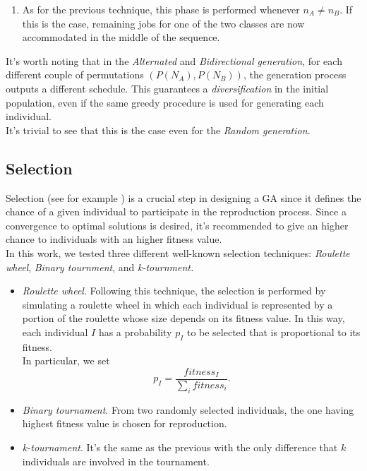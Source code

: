 \documentclass[opre,nonblindrev]{informs3} %
\begin{document}
\begin{itemize}
\begin{enumerate}
		\item As for the previous technique, this phase is performed whenever $n_A \ne n_B$. If this is the case, remaining jobs for one of the two classes are now accommodated in the middle of the sequence. 
	\end{enumerate}
	It's worth noting that in the \textit{Alternated} and \textit{Bidirectional generation}, for each different couple of permutations $(P(N_A),P(N_B))$, the generation process outputs a different schedule. This guarantees a \textit{diversification} in the initial population, even if the same greedy procedure is used for generating each individual.\\ It's trivial to see that this is the case even for the \textit{Random generation.}
\end{itemize}
\subsection{Selection}
Selection (see for example \cite{sel1}) is a crucial step in designing a GA since it defines the chance of a given individual to participate in the reproduction process. Since a convergence to optimal solutions is desired, it's recommended to give an higher chance to individuals with an higher fitness value.\\
In this work, we tested three different well-known selection techniques: \textit{Roulette wheel}, \textit{Binary tournment}, and \textit{k-tournment.}
\begin{itemize}
	\item \textit{Roulette wheel}. Following this technique, the selection is performed by simulating a roulette wheel in which each individual is represented by a portion of the roulette whose size depends on its fitness value. In this way, each individual $I$ has a probability $p_I$ to be selected that is proportional to its fitness.\\In particular, we set $$p_I = \frac{fitness_I}{\sum_{i}fitness_i}.$$
	\item \textit{Binary tournament}. From two randomly selected individuals, the one having highest fitness value is chosen for reproduction.
	\item \textit{k-tournament}. It's the same as the previous with the only difference that $k$ individuals are involved in the tournament. 
\end{itemize}
\end{document}
